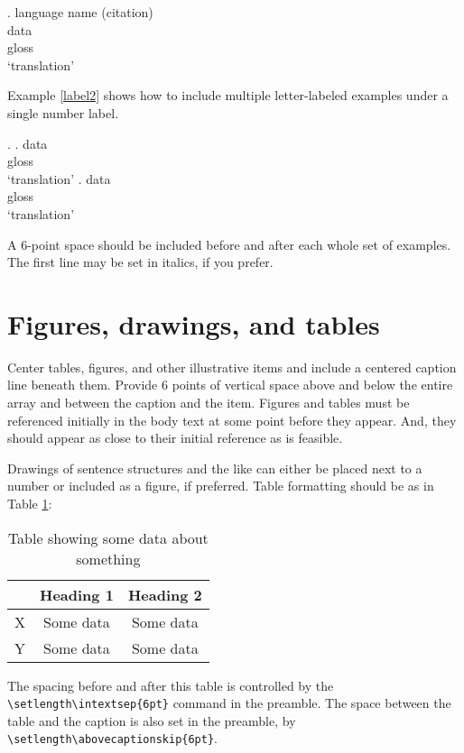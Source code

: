 \documentclass[12pt,letterpaper]{article}
\begin{document}
\ex. language name (citation) \label{label}\\
data\\
gloss\\
`translation' 

Example  \ref{label2} shows how to include multiple letter-labeled examples under a single number label.

\ex. \label{label2} 
\ag. data  \\
gloss\\
`translation' 
\bg. data\\
gloss\\
`translation' 

 A 6-point space should be included before and after each whole set of examples. The first line
may be set in italics, if you prefer.
 
 
 
\section{Figures, drawings, and tables}

Center tables, figures, and other illustrative items and include a centered caption line beneath them. Provide 6 points of vertical space above and below the entire array and between the caption and the item. Figures and tables must be referenced initially in the body text at some point before they appear. And, they should appear as close to their initial reference as is feasible.

Drawings of sentence structures and the like can either be placed next to a number or included as a figure, if preferred. Table formatting should be as in Table \ref{t:table}: 

\begin{table}[h]
\centering
	\begin{tabular}{l c c}
	& Heading 1 & Heading 2\\
	\hline
	X &  Some data & Some data\\
	Y & Some data & Some data \\
	\hline
	\end{tabular}
\caption{Table showing some data about something \label{t:table}}
\end{table}

\noindent The spacing before and after this table is controlled by the \verb=\setlength\intextsep{6pt}= command in the preamble. The space between the table and the caption is also set in the preamble, by \verb=\setlength\abovecaptionskip{6pt}=.
\end{document}
